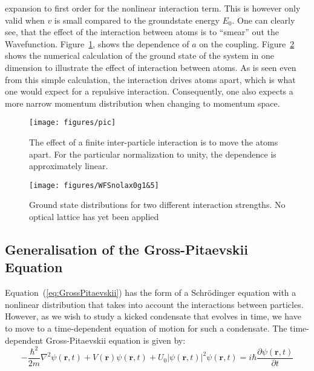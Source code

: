 expansion to first order for the nonlinear interaction term. This is however only valid when $v$ is small compared to the groundstate energy $E_0$.   
One can clearly see, that the effect of the interaction between atoms is to ``smear'' out the Wavefunction. Figure~\ref{fig:pic}, shows the dependence of $a$ on the coupling. Figure~\ref{fig:WFSnolak0g1&5} shows the numerical calculation of the ground state of the system in one dimension to illustrate the effect of interaction between atoms. As is seen even from this simple calculation, the interaction drives atoms apart, which is what one would expect for a repulsive interaction. Consequently, one also expects a more narrow momentum distribution when changing to momentum space.

\begin{figure}[H]
\begin{center}
\texttt{[image: figures/pic]}
\caption{The effect of a finite inter-particle interaction is to move the atoms apart. For the particular normalization to unity, the dependence is approximately linear.}
\label{fig:pic}
\end{center}
\end{figure}

\begin{figure}[H]
\begin{center}
\texttt{[image: figures/WFSnolax0g1\&5]}
\caption{Ground state distributions for two different interaction strengths. No optical lattice has yet been applied}
\label{fig:WFSnolak0g1&5}
\end{center}
\end{figure}

\subsection{Generalisation of the Gross-Pitaevskii Equation}
Equation~(\ref{eq:GrossPitaevskii}) has the form of a Schr\"odinger equation with a nonlinear distribution that takes into account the interactions between particles. 
However, as we wish to study a kicked condensate that evolves in time, we have to move to a time-dependent equation of motion for such a condensate. 
The time-dependent Gross-Pitaevskii equation is given by:
\begin{equation}\label{eq:GrossPitaevskiit}
	-\frac{\hbar^2}{2m}\nabla^2\psi(\mathbf{r},t) + V(\mathbf{r})\psi(\mathbf{r},t) + U_0|\psi(\mathbf{r},t)|^2\psi(\mathbf{r},t)=i\hbar\frac{\partial\psi(\mathbf{r},t)}{\partial t}
\end{equation}


